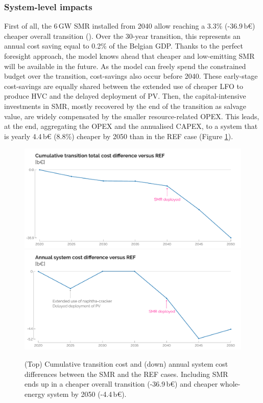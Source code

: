 \documentclass[11pt,twoside,a4paper,english]{article}
\begin{document}
\newpage
\subsubsection{System-level impacts}
\label{subsubsec:atom_mol:results_deter_overall}
First of all, the 6\,GW \gls{SMR} installed from 2040 allow reaching a 3.3\% (-36.9\,b€) cheaper overall transition (). Over the 30-year transition, this represents an annual cost saving equal to 0.2\% of the Belgian GDP. Thanks to the perfect foresight approach, the model knows ahead that cheaper and low-emitting \gls{SMR} will be available in the future. As the model can freely spend the constrained  budget over the transition, cost-savings also occur before 2040. These early-stage cost-savings are equally shared between the extended use of cheaper \gls{LFO} to produce \gls{HVC} and the delayed deployment of \gls{PV}. Then, the capital-intensive investments in \gls{SMR}, mostly recovered by the end of the transition as salvage value, are widely compensated by the smaller resource-related OPEX. This leads, at the end, aggregating the OPEX and the annualised CAPEX, to a system that is yearly 4.4\,b€ (8.8\%) cheaper by 2050 than in the REF case (Figure \ref{fig:results_deter_overall_emissions_sector}).

\begin{figure}[htbp!]
\centering
\includegraphics[width=\textwidth]{Cum_total_cost_diff_REF.pdf}
\includegraphics[width=\textwidth]{System_cost_DIFF.pdf}
\caption{(Top) Cumulative transition cost and (down) annual system cost differences between the SMR and the REF cases. Including \gls{SMR} ends up in a cheaper overall transition (-36.9\,b€) and cheaper whole-energy system by 2050 (-4.4\,b€).}
\label{fig:results_deter_overall_emissions_sector}
\end{figure}
\end{document}
